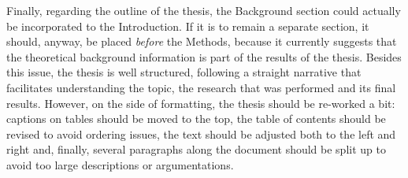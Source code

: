 \documentclass[a4paper,fontsize=11pt,bibliography=totoc]{scrartcl}
\begin{document}
Finally, regarding the outline of the thesis, the Background section could actually be incorporated to the Introduction. If it is to remain a separate section, it should, anyway, be placed \emph{before} the Methods, because it currently suggests that the theoretical background information is part of the results of the thesis. Besides this issue, the thesis is well structured, following a straight narrative that facilitates understanding the topic, the research that was performed and its final results. However, on the side of formatting, the thesis should be re-worked a bit: captions on tables should be moved to the top, the table of contents should be revised to avoid ordering issues, the text should be adjusted both to the left and right and, finally, several paragraphs along the document should be split up to avoid too large descriptions or argumentations.

\end{document}
